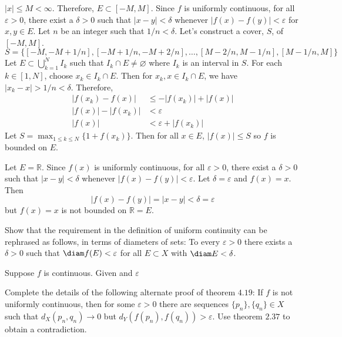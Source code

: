 \begin{exercise}
  \(\lvert x\rvert\leq M < \infty\).
  Therefore, \(E\subset [-M,M]\).
  Since \(f\) is uniformly continuous, for all \(\varepsilon > 0\), there exist a
  \(\delta > 0\) such that \(\lvert x - y\rvert < \delta\) whenever
  \(\lvert f(x) - f(y)\rvert < \varepsilon\) for \(x,y\in E\).
  Let \(n\) be an integer such that \(1/n < \delta\).
  Let's construct a cover, \(S\), of \([-M,M]\).
  \[
  S = \bigl\{[-M, -M + 1/n], [-M + 1/n, -M + 2/n],\ldots,[M - 2/n, M - 1/n],
  [M - 1/n, M]\bigr\}
  \]
  Let \(E\subset\bigcup_{k = 1}^NI_k\) such that \(I_k\cap E\neq\varnothing\)
  where \(I_k\) is an interval in \(S\).
  For each \(k\in[1,N]\), choose \(x_k\in I_k\cap E\).
  Then for \(x_k,x\in I_k\cap E\), we have
  \(\lvert x_k - x\rvert > 1/n < \delta\).
  Therefore,
  \begin{align*}
    \lvert f(x_k) - f(x)\rvert
    & \leq -\lvert f(x_k)\rvert + \lvert f(x)\rvert\\
    \lvert f(x)\rvert - \lvert f(x_k)\rvert & < \varepsilon\\
    \lvert f(x)\rvert & < \varepsilon + \lvert f(x_k)\rvert
  \end{align*}
  Let \(S = \max_{1\leq k\leq N}\{1 + f(x_k)\}\).
  Then for all \(x\in E\), \(\lvert f(x)\rvert\leq S\) so \(f\) is bounded on
  \(E\).
  \par\smallskip
  Let \(E = \mathbb{R}\).
  Since \(f(x)\) is uniformly continuous, for all \(\varepsilon > 0\), there exist
  a \(\delta > 0\) such that \(\lvert x - y\rvert < \delta\) whenever
  \(\lvert f(x) - f(y)\rvert < \varepsilon\).
  Let \(\delta = \varepsilon\) and \(f(x) = x\).
  Then
  \[
  \lvert f(x) - f(y)\rvert = \lvert x - y\rvert < \delta = \varepsilon
  \]
  but \(f(x) = x\) is not bounded on \(\mathbb{R} = E\).
\item
  \label{4.9}
  Show that the requirement in the definition of uniform continuity can be
  rephrased as follows, in terms of diameters of sets: To every
  \(\varepsilon > 0\) there exists a \(\delta > 0\) such that
  \(\diam f(E) < \varepsilon\) for all \(E\subset X\) with \(\diam E < \delta\).
  \par\smallskip
  Suppose \(f\) is continuous. Given and \(\varepsilon\)
\item
  Complete the details of the following alternate  proof of theorem \(4.19\):
  If \(f\) is not uniformly continuous, then for some \(\varepsilon > 0\) there
  are sequences \(\{p_n\},\{q_n\}\in X\) such that \(d_X(p_n,q_n)\to 0\) but
  \(d_Y(f(p_n),f(q_n)) > \varepsilon\).
  Use theorem \(2.37\) to obtain a contradiction.

\end{exercise}
